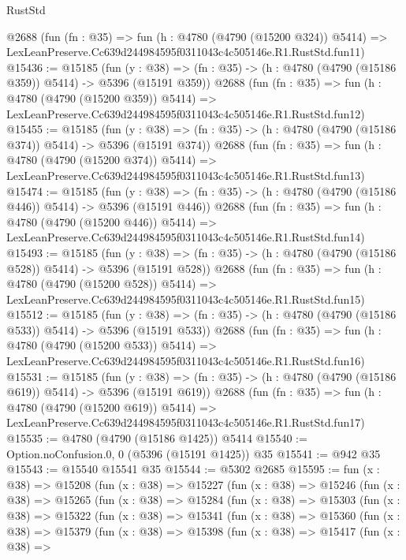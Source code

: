 \begin{lexlean}{RustStd}
\begin{coremodule}
    @2688
    (fun (fn : @35) =>
    fun (h : @4780 (@4790 (@15200 @324)) @5414) =>
    LexLeanPreserve.Cc639d244984595f0311043c4c505146e.R1.RustStd.fun11)
@15436 := @15185
    (fun (y : @38) => (fn : @35) -> (h : @4780 (@4790 (@15186 @359)) @5414) -> @5396 (@15191 @359))
    @2688
    (fun (fn : @35) =>
    fun (h : @4780 (@4790 (@15200 @359)) @5414) =>
    LexLeanPreserve.Cc639d244984595f0311043c4c505146e.R1.RustStd.fun12)
@15455 := @15185
    (fun (y : @38) => (fn : @35) -> (h : @4780 (@4790 (@15186 @374)) @5414) -> @5396 (@15191 @374))
    @2688
    (fun (fn : @35) =>
    fun (h : @4780 (@4790 (@15200 @374)) @5414) =>
    LexLeanPreserve.Cc639d244984595f0311043c4c505146e.R1.RustStd.fun13)
@15474 := @15185
    (fun (y : @38) => (fn : @35) -> (h : @4780 (@4790 (@15186 @446)) @5414) -> @5396 (@15191 @446))
    @2688
    (fun (fn : @35) =>
    fun (h : @4780 (@4790 (@15200 @446)) @5414) =>
    LexLeanPreserve.Cc639d244984595f0311043c4c505146e.R1.RustStd.fun14)
@15493 := @15185
    (fun (y : @38) => (fn : @35) -> (h : @4780 (@4790 (@15186 @528)) @5414) -> @5396 (@15191 @528))
    @2688
    (fun (fn : @35) =>
    fun (h : @4780 (@4790 (@15200 @528)) @5414) =>
    LexLeanPreserve.Cc639d244984595f0311043c4c505146e.R1.RustStd.fun15)
@15512 := @15185
    (fun (y : @38) => (fn : @35) -> (h : @4780 (@4790 (@15186 @533)) @5414) -> @5396 (@15191 @533))
    @2688
    (fun (fn : @35) =>
    fun (h : @4780 (@4790 (@15200 @533)) @5414) =>
    LexLeanPreserve.Cc639d244984595f0311043c4c505146e.R1.RustStd.fun16)
@15531 := @15185
    (fun (y : @38) => (fn : @35) -> (h : @4780 (@4790 (@15186 @619)) @5414) -> @5396 (@15191 @619))
    @2688
    (fun (fn : @35) =>
    fun (h : @4780 (@4790 (@15200 @619)) @5414) =>
    LexLeanPreserve.Cc639d244984595f0311043c4c505146e.R1.RustStd.fun17)
@15535 := @4780 (@4790 (@15186 @1425)) @5414
@15540 := Option.noConfusion.{0, 0} (@5396 (@15191 @1425)) @35
@15541 := @942 @35
@15543 := @15540 @15541 @35
@15544 := @5302 @2685
@15595 := fun (x : @38) =>
  @15208
    (fun (x : @38) =>
    @15227
      (fun (x : @38) =>
      @15246
        (fun (x : @38) =>
        @15265
          (fun (x : @38) =>
          @15284
            (fun (x : @38) =>
            @15303
              (fun (x : @38) =>
              @15322
                (fun (x : @38) =>
                @15341
                  (fun (x : @38) =>
                  @15360
                    (fun (x : @38) =>
                    @15379
                      (fun (x : @38) =>
                      @15398
                        (fun (x : @38) =>
                        @15417
                          (fun (x : @38) =>

\end{coremodule}
\end{lexlean}
